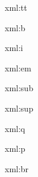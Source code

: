 
\startxmlsetups xml:tt
	{\tt {}}
\stopxmlsetups

\startxmlsetups xml:b
	{\bf {}}
\stopxmlsetups

\startxmlsetups xml:i
	{\it {}}
\stopxmlsetups

\startxmlsetups xml:em
	{\em {}}
\stopxmlsetups

\startxmlsetups xml:sub
\stopxmlsetups

\startxmlsetups xml:sup
\stopxmlsetups

\startxmlsetups xml:q
\stopxmlsetups

\startxmlsetups xml:p
	\par
\stopxmlsetups

\startxmlsetups xml:br
	\crlf
\stopxmlsetups

